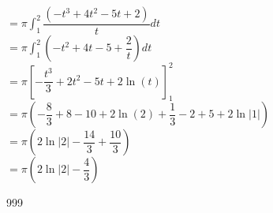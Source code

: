 \documentclass[a4paper]{article}
\newcommand{\dint}{\displaystyle\int}
\begin{document}
$=\pi \dint_{1}^{2} \dfrac{(-t^3+4t^2-5t+2)}{t} dt$ \\

$=\pi \dint_{1}^{2} (-t^2+4t-5+\dfrac{2}{t}) dt$ \\

$=\pi \left[ -\dfrac{t^3}{3} + 2t^2 - 5t + 2 \ln(t) \right]_{1}^{2}$ \\

$=\pi \left( -\dfrac{8}{3} + 8 - 10 + 2 \ln(2) + \dfrac{1}{3} - 2 + 5 + 2 \ln|1| \right)$ \\

$=\pi \left(2 \ln|2| - \dfrac{14}{3} + \dfrac{10}{3} \right)$ \\

$=\pi \left(2 \ln|2| - \dfrac{4}{3} \right)$ \\

\begin{thebibliography}{999}
\end{thebibliography}
\end{document}
